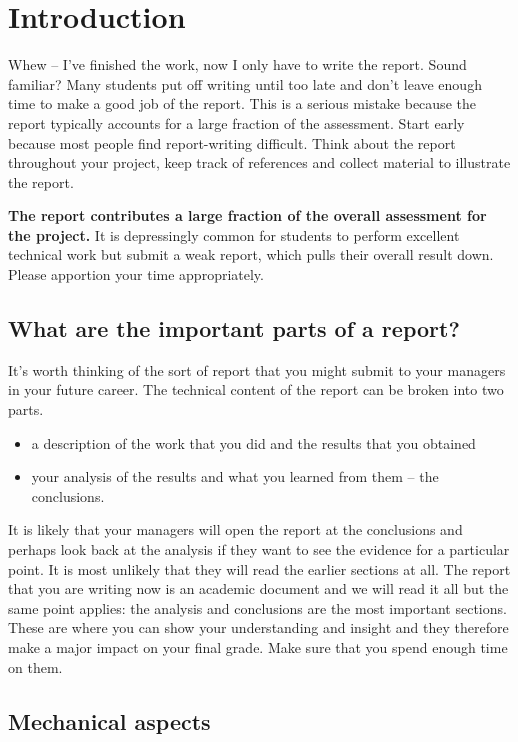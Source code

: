 \section{Introduction}

Whew – I’ve finished the work, now I only have to write the report. Sound
familiar? Many students put off writing until too late and don’t leave enough
time to make a good job of the report. This is a serious mistake because the
report typically accounts for a large fraction of the assessment. Start early
because most people find report-writing difficult. Think about the report
throughout your project, keep track of references and collect material to
illustrate the report.

\textbf{The report contributes a large fraction of the overall assessment for
    the project.} It is depressingly common for students to perform excellent
technical work but submit a weak report, which pulls their overall result down.
Please apportion your time appropriately.

\subsection{What are the important parts of a report?}

It’s worth thinking of the sort of report that you might submit to your managers
in your future career. The technical content of the report can be broken into
two parts.

\begin{itemize}
    \item a description of the work that you did and the results that you
          obtained
    \item your analysis of the results and what you learned from them – the
          conclusions.
\end{itemize}

It is likely that your managers will open the report at the conclusions and
perhaps look back at the analysis if they want to see the evidence for a
particular point. It is most unlikely that they will read the earlier sections
at all. The report that you are writing now is an academic document and we will
read it all but the same point applies: the analysis and conclusions are the
most important sections. These are where you can show your understanding and
insight and they therefore make a major impact on your final grade. Make sure
that you spend enough time on them.

\subsection{Mechanical aspects}


